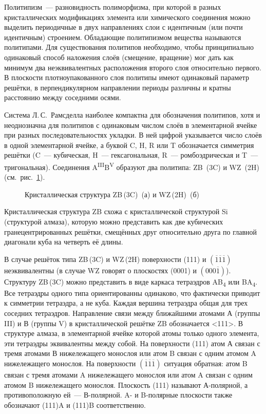 Политипизм~--- разновидность полиморфизма, при которой в разных кристаллических
модификациях элемента или химического соединения можно выделить периодичные в
двух направлениях слои с идентичным (или почти идентичным) строением.
Обладающие политипизмом вещества называются политипами. Для существования
политипов необходимо, чтобы принципиально одинаковый способ наложения слоёв
(смещение, вращение) мог дать как минимум два неэквивалентных расположения
второго слоя относительно первого. В плоскости плотноупакованного слоя политипы
имеют одинаковый параметр решётки, в перпендикулярном направлении периоды
различны и кратны расстоянию между соседними осями.

Система Л.\,С.~Рамсделла наиболее компактна для обозначения политипов, хотя и
неоднозначна для политипов с одинаковым числом слоёв в элементарной ячейке при
разных последовательностях укладки. В ней цифрой указывается число слоёв в
одной элементарной ячейке, а буквой C, H, R или T обозначается симметрия
решётки (C~--- кубическая, H~--- гексагональная, R~--- ромбоэдрическая и T~---
тригональная). Соединения A\textsuperscript{III}B\textsuperscript{V} образуют
два политипа: ZB~(3C) и WZ~(2H) (см.~рис.~\cref{fig:Image_5}).

\begin{figure}[ht] 
			\caption{Кристаллическая структура ZB\,(3C)~(а) и
		WZ\,(2H)~(б)}\label{fig:Image_5} \end{figure}

Кристаллическая структура ZB схожа с кристаллической структурой Si (структурой
алмаза), которую можно представить как две кубических гранецентрированных
решётки, смещённых друг относительно друга по главной диагонали куба на
четверть её длины.

В случае решёток типа ZB\,(3C) и WZ\,(2H) поверхности (111) и
\((\overline{1}\overline{1}\overline{1})\) неэквивалентны (в случае WZ говорят
о плоскостях (0001) и \((000\overline{1})\)). Структуру ZB\,(3C) можно
представить в виде каркаса тетраэдров AB\textsubscript{4} или
BA\textsubscript{4}. Все тетраэдры одного типа ориентированны одинаково, что
фактически приводит к симметрии тетраэдра, а не куба. Каждая вершина тетраэдра
общая для трех соседних тетраэдров. Направление связи между ближайшими атомами
А (группы III) и В (группы V) в кристаллической решётке ZB обозначается <111>.
В структуре алмаза, в элементарной ячейке которой атомы только одного элемента,
эти тетраэдры эквивалентны между собой. На поверхности (111) атом А связан с
тремя атомами В нижележащего монослоя или атом B связан с одним атомом A
нижележащего монослоя. На поверхности
\((\overline{1}\overline{1}\overline{1})\) ситуация обратная: атом B связан с
тремя атомами A нижележащего монослоя или атом A связан с одним атомом B
нижележащего монослоя. Плоскость (111) называют А-полярной, а противоположную
ей~--- В-полярной. A- и B-полярные плоскости также обозначают (111)A и (111)B
соответственно.


